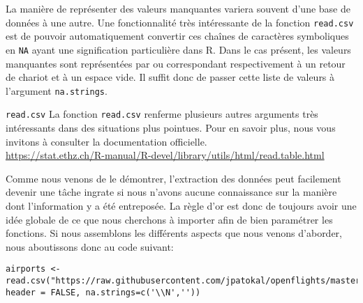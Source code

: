 La manière de représenter des valeurs manquantes variera souvent d'une base de données à une autre. Une fonctionnalité très intéressante de la fonction \texttt{read.csv} est de pouvoir automatiquement convertir ces chaînes de caractères symboliques en \texttt{NA} ayant une signification particulière dans R. Dans le cas présent, les valeurs manquantes sont représentées par  ou  correspondant respectivement à un retour de chariot et à un espace vide. Il suffit donc de passer cette liste de valeurs à l'argument \texttt{na.strings}. \\

\begin{moreInfo}{\texttt{read.csv}}
	La fonction \texttt{read.csv} renferme plusieurs autres arguments très intéressants dans des situations plus pointues. Pour en savoir plus, nous vous invitons à consulter la documentation officielle. \\
	\url{https://stat.ethz.ch/R-manual/R-devel/library/utils/html/read.table.html}
\end{moreInfo}

Comme nous venons de le démontrer, l'extraction des données peut facilement devenir une tâche ingrate si nous n'avons aucune connaissance sur la manière dont l'information y a été entreposée. La règle d'or est donc de toujours avoir une idée globale de ce que nous cherchons à importer afin de bien paramétrer les fonctions. Si nous assemblons les différents aspects que nous venons d'aborder, nous aboutissons donc au code suivant:
\begin{lstlisting}[caption = Extraction des données,label=src:Extraction]
	airports <- read.csv("https://raw.githubusercontent.com/jpatokal/openflights/master/data/airports.dat", header = FALSE, na.strings=c('\\N',''))
\end{lstlisting}